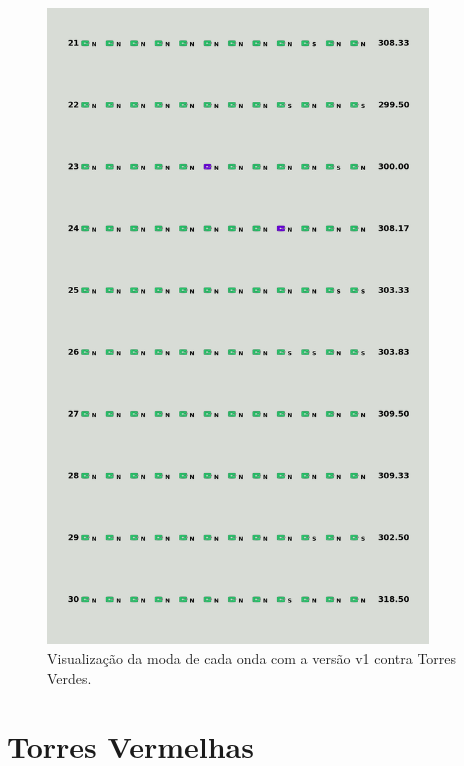\begin{figure}[H]
  \centering
  \includegraphics[width=0.9\textwidth]{figuras/td/td_allgreen_ai_mode_1_3.png}
  \caption{Visualização da moda de cada onda com a versão v1 contra Torres Verdes.}
  \label{fig:td-moda-green-1-3}
\end{figure}

\section{Torres Vermelhas}
\label{sec:apend-moda-td-r-v1}

